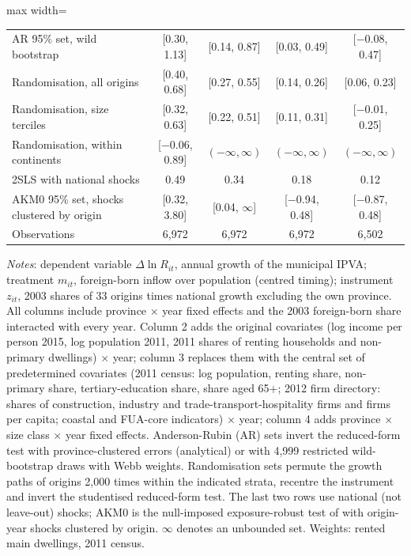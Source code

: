 \begin{table}[!htbp]
\begin{adjustbox}{max width=\linewidth}
\begin{tabular}{lcccc}
AR 95\% set, wild bootstrap & [0.30, 1.13] & [0.14, 0.87] & [0.03, 0.49] & [$-$0.08, 0.47] \\
Randomisation, all origins & [0.40, 0.68] & [0.27, 0.55] & [0.14, 0.26] & [0.06, 0.23] \\
Randomisation, size terciles & [0.32, 0.63] & [0.22, 0.51] & [0.11, 0.31] & [$-$0.01, 0.25] \\
Randomisation, within continents & [$-$0.06, 0.89] & $(-\infty,\infty)$ & $(-\infty,\infty)$ & $(-\infty,\infty)$ \\
2SLS with national shocks & 0.49 & 0.34 & 0.18 & 0.12 \\
AKM0 95\% set, shocks clustered by origin & [0.32, 3.80] & [0.04, $\infty$] & [$-$0.94, 0.48] & [$-$0.87, 0.48] \\
Observations & 6,972 & 6,972 & 6,972 & 6,502 \\
\bottomrule
\end{tabular}\end{adjustbox}
\begin{minipage}{0.97\linewidth}\footnotesize\vspace{4pt}
\textit{Notes}: dependent variable $\Delta\ln R_{it}$, annual growth of the municipal IPVA; treatment $m_{it}$, foreign-born inflow over population (centred timing); instrument $z_{it}$, 2003 shares of 33 origins times national growth excluding the own province. All columns include province $\times$ year fixed effects and the 2003 foreign-born share interacted with every year. Column 2 adds the original covariates (log income per person 2015, log population 2011, 2011 shares of renting households and non-primary dwellings) $\times$ year; column 3 replaces them with the central set of predetermined covariates (2011 census: log population, renting share, non-primary share, tertiary-education share, share aged 65+; 2012 firm directory: shares of construction, industry and trade-transport-hospitality firms and firms per capita; coastal and FUA-core indicators) $\times$ year; column 4 adds province $\times$ size class $\times$ year fixed effects. Anderson-Rubin (AR) sets invert the reduced-form test with province-clustered errors (analytical) or with 4,999 restricted wild-bootstrap draws with Webb weights. Randomisation sets permute the growth paths of origins 2,000 times within the indicated strata, recentre the instrument and invert the studentised reduced-form test. The last two rows use national (not leave-out) shocks; AKM0 is the null-imposed exposure-robust test of \citet{adao2019} with origin-year shocks clustered by origin. $\infty$ denotes an unbounded set. Weights: rented main dwellings, 2011 census.
\end{minipage}\end{table}
